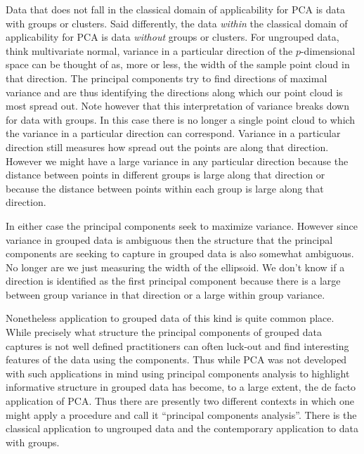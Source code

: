 \documentclass{book}
\begin{document}
Data that does not fall in the classical domain of applicability for PCA is data with groups or clusters. Said differently, the data \emph{within} the classical domain of applicability for PCA is data \emph{without} groups or clusters. For ungrouped data, think multivariate normal, variance in a particular direction of the $p$-dimensional space can be thought of as, more or less, the width of the sample point cloud in that direction. The principal components try to find directions of maximal variance and are thus identifying the directions along which our point cloud is most spread out. Note however that this interpretation of variance breaks down for data with groups. In this case there is no longer a single point cloud to which the variance in a particular direction can correspond. Variance in a particular direction still measures how spread out the points are along that direction. However we might have a large variance in any particular direction because the distance between points in different groups is large along that direction or because the distance between points within each group is large along that direction. 

In either case the principal components seek to maximize variance. However since variance in grouped data is ambiguous then the structure that the principal components are seeking to capture in grouped data is also somewhat ambiguous. No longer are we just measuring the width of the ellipsoid. We don't know if a direction is identified as the first principal component because there is a large between group variance in that direction or a large within group variance.

Nonetheless application to grouped data of this kind is quite common place. While precisely what structure the principal components of grouped data captures is not well defined practitioners can often luck-out and find interesting features of the data using the components. Thus while PCA was not developed with such applications in mind using principal components analysis to highlight informative structure in grouped data has become, to a large extent, the de facto application of PCA. Thus there are presently two different contexts in which one might apply a procedure and call it ``principal components analysis''. There is the classical application to ungrouped data and the contemporary application to data with groups. 
\end{document}
